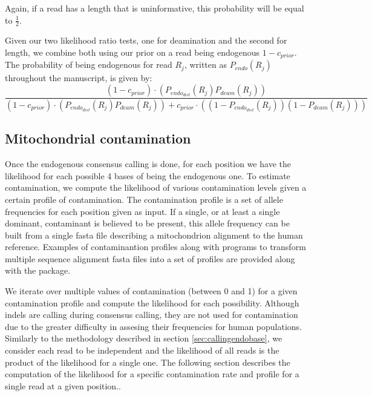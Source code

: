 \documentclass[a4paper,12pt]{article}
\begin{document}
\noindent Again, if a read has a length that is uninformative, this probability will be equal to $\frac {1} {2}$.


Given our two likelihood ratio tests, one for deamination and the second for length, we combine both using our prior on a read being endogenous $1-c_{prior}$. The probability of being endogenous for read $R_j$, written as $P_{endo} (R_j)$ throughout the manuscript, is given by:
{\scriptsize
\begin{equation}
 \frac {  (1-c_{prior}) \cdot ( P_{endo_{dist} }(R_j) P_{deam}(R_j) ) } {  (1-c_{prior}) \cdot ( P_{ endo_{dist} }(R_j) P_{deam}(R_j)) + c_{prior} \cdot ( (1-P_{endo_{dist} }(R_j)) (1- P_{deam}(R_j) )) }
\end{equation}
}







\subsection{Mitochondrial contamination}
\label{sec:contest}

Once the endogenous consensus calling is done, for each position we have the likelihood for each possible 4 bases of being the endogenous one. To estimate contamination, we compute the likelihood of various contamination levels given a certain profile of contamination. The contamination profile is a set of allele frequencies for each position given as input. If a single, or at least a single dominant, contaminant is believed to be present, this allele frequency can be built from a single fasta file describing a mitochondrion alignment to the human reference.  Examples of contaminantion profiles along with programs to transform multiple sequence alignment fasta files into a set of profiles are provided along with the package. 

We iterate over multiple values of contamination (between 0 and 1) for a given contamination profile and compute the likelihood for each possibility. Although indels are calling during consensus calling, they are not used for contamination due to the greater difficulty in assesing their frequencies for human populations. Similarly to the methodology described in section \ref{sec:callingendobase}, we consider each read to be independent and the likelihood of all reads is the product of the likelihood for a single one. The following section describes the computation of the likelihood for a specific contamination rate and profile for a single read at a given position.. 
\end{document}
